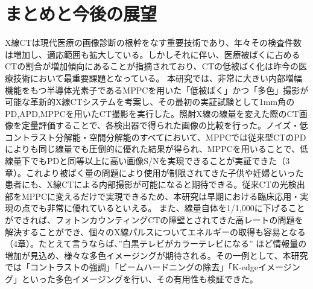 \chapter{まとめと今後の展望}
X線CTは現代医療の画像診断の根幹をなす重要技術であり、年々その検査件数は増加し、適応範囲も拡大している。しかしそれに伴い、医療被ばくに占めるCTの割合が増加傾向にあることが指摘されており、CTの低被ばく化は昨今の医療技術において最重要課題となっている。
本研究では、非常に大きい内部増幅機能をもつ半導体光素子であるMPPCを用いた「低被ばく」かつ「多色」撮影が可能な革新的X線CTシステムを考案し、その最初の実証試験として1mm角のPD,APD,MPPCを用いたCT撮影を実行した。照射X線の線量を変えた際のCT画像を定量評価することで、各検出器で得られた画像の比較を行った。ノイズ・低コントラスト分解能・空間分解能のすべてにおいて、MPPCでは従来型CTのPDによりも同じ線量でも圧倒的に優れた結果が得られ、MPPCを用いることで、低線量下でもPDと同等以上に高い画像S/Nを実現できることが実証できた（3章）。これより被ばく量の問題により使用が制限されてきた子供や妊婦といった患者にも、X線CTによる内部撮影が可能になると期待できる。従来CTの光検出部をMPPCに変えるだけで実現できるため、本研究は早期における臨床応用・実現の点でも非常に優れているといえる。
また、線量自体を1/1,000に下げることができれば、フォトンカウンティングCTの障壁とされてきた高レートの問題を解決することができ、個々のX線パルスについてエネルギーの取得も容易となる（4章）。たとえて言うならば、”白黒テレビがカラーテレビになる” ほど情報量の増加が見込め、様々な多色イメージングが期待される。その一例として、本研究では「コントラストの強調」「ビームハードニングの除去」「K-edgeイメージング」といった多色イメージングを行い、その有用性も検証できた。


